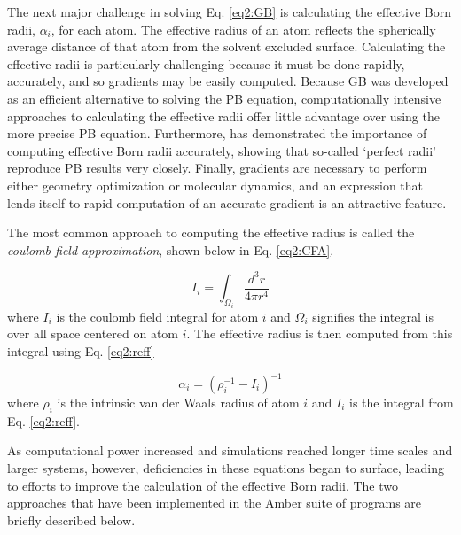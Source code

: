 The next major challenge in solving Eq. \ref{eq2:GB} is calculating the
effective Born radii, $\alpha_i$, for each atom. The effective radius of an atom
reflects the spherically average distance of that atom from the solvent excluded
surface. Calculating the effective radii is particularly challenging because it
must be done rapidly, accurately, and so gradients may be easily computed.
Because GB was developed as an efficient alternative to solving the PB equation,
computationally intensive approaches to calculating the effective radii offer
little advantage over using the more precise PB equation. Furthermore,
\citeauthor{Onufriev_JComputChem_2002_v23_p1297} has demonstrated the importance
of computing effective Born radii accurately,
\cite{Onufriev_JComputChem_2002_v23_p1297} showing that so-called `perfect
radii' reproduce PB results very closely. Finally, gradients are necessary to
perform either geometry optimization or molecular dynamics, and an expression
that lends itself to rapid computation of an accurate gradient is an attractive
feature.

The most common approach to computing the effective radius is called the
\emph{coulomb field approximation}, shown below in Eq. \ref{eq2:CFA}.
\cite{Cramer_Book_EssentialsCompChem_2004}

\begin{equation}
   I _ i = \int _ {\Omega_i} \frac {d^3r} {4 \pi r ^ 4}
   \label{eq2:CFA}
\end{equation}
where $I_i$ is the coulomb field integral for atom $i$ and $\Omega_i$ signifies
the integral is over all space centered on atom $i$. The effective radius is
then computed from this integral using Eq. \ref{eq2:reff}

\begin{equation}
   \alpha _ {i} = \left( \rho _ i ^ {-1} - I _ i \right) ^ {-1}
   \label{eq2:reff}
\end{equation}
where $\rho_i$ is the intrinsic van der Waals radius of atom $i$ and $I_i$ is
the integral from Eq. \ref{eq2:reff}.

As computational power increased and simulations reached longer time scales and
larger systems, however, deficiencies in these equations began to surface,
leading to efforts to improve the calculation of the effective Born radii.
\cite{Onufriev_JComputChem_2002_v23_p1297, Onufriev_Proteins_2004_v55_p383,
Mongan_JChemTheoryComput_2007_v3_p156, Nguyen_JChemTheoryComput_2013_ASAP} The
two approaches that have been implemented in the Amber suite of programs are
briefly described below.

